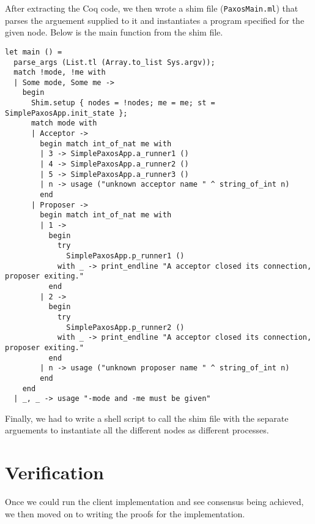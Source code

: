 After extracting the Coq code, we then wrote a shim file (\texttt{PaxosMain.ml})
that parses the arguement supplied to it and instantiates a program specified
for the given node. Below is the main function from the shim file.

\begin{lstlisting}
let main () =
  parse_args (List.tl (Array.to_list Sys.argv));
  match !mode, !me with
  | Some mode, Some me ->
    begin
      Shim.setup { nodes = !nodes; me = me; st = SimplePaxosApp.init_state };
      match mode with
      | Acceptor ->
        begin match int_of_nat me with
        | 3 -> SimplePaxosApp.a_runner1 ()
        | 4 -> SimplePaxosApp.a_runner2 ()
        | 5 -> SimplePaxosApp.a_runner3 ()
        | n -> usage ("unknown acceptor name " ^ string_of_int n)
        end
      | Proposer ->
        begin match int_of_nat me with
        | 1 ->
          begin
            try
              SimplePaxosApp.p_runner1 ()
            with _ -> print_endline "A acceptor closed its connection, proposer exiting."
          end
        | 2 ->
          begin
            try
              SimplePaxosApp.p_runner2 ()
            with _ -> print_endline "A acceptor closed its connection, proposer exiting."
          end
        | n -> usage ("unknown proposer name " ^ string_of_int n)
        end
    end
  | _, _ -> usage "-mode and -me must be given"
\end{lstlisting}

Finally, we had to write a shell script to call the shim file with the separate
arguements to instantiate all the different nodes as different processes.

\section{Verification}
Once we could run the client implementation and see consensus being achieved,
we then moved on to writing the proofs for the implementation.
